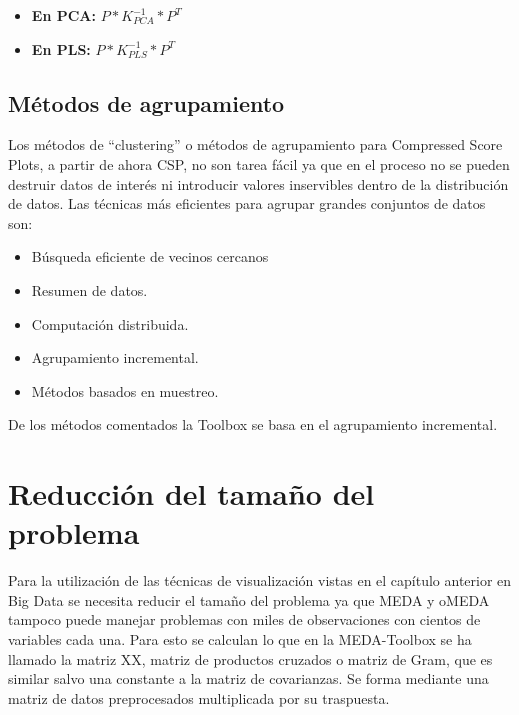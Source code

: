 \begin{itemize}
	\item \textbf{En PCA:} $P*K_{PCA}^{-1}*P^T$
	
	\item \textbf{En PLS:} $P*K_{PLS}^{-1}*P^T$
\end{itemize}

\bigskip

\subsection{Métodos de agrupamiento}
Los métodos de “clustering” o métodos de agrupamiento para Compressed Score Plots, a partir de ahora CSP, no son tarea fácil ya que en el proceso no se pueden destruir datos de interés ni introducir valores inservibles dentro de la distribución de datos. Las técnicas más eficientes para agrupar grandes conjuntos de datos son:
\bigskip

\begin{itemize}
	\item Búsqueda eficiente de vecinos cercanos   
	
	\item Resumen de datos.
	
	\item Computación distribuida.
	
	\item Agrupamiento incremental.
	
	\item Métodos basados en muestreo.
\end{itemize}

De los métodos comentados la Toolbox se basa en el agrupamiento incremental.

\bigskip

\section{Reducción del tamaño del problema}
Para la utilización de las técnicas de visualización vistas en el capítulo anterior en Big Data se necesita reducir el tamaño del problema ya que MEDA y oMEDA tampoco puede manejar problemas con miles de observaciones con cientos de variables cada una. Para esto se calculan lo que en la MEDA-Toolbox se ha llamado la matriz XX, matriz de productos cruzados o matriz de Gram, que es similar salvo una constante a la matriz de covarianzas. Se forma mediante una matriz de datos preprocesados multiplicada por su traspuesta.

